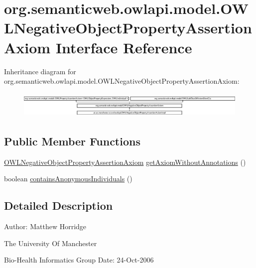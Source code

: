 \hypertarget{interfaceorg_1_1semanticweb_1_1owlapi_1_1model_1_1_o_w_l_negative_object_property_assertion_axiom}{\section{org.\-semanticweb.\-owlapi.\-model.\-O\-W\-L\-Negative\-Object\-Property\-Assertion\-Axiom Interface Reference}
\label{interfaceorg_1_1semanticweb_1_1owlapi_1_1model_1_1_o_w_l_negative_object_property_assertion_axiom}
}
Inheritance diagram for org.\-semanticweb.\-owlapi.\-model.\-O\-W\-L\-Negative\-Object\-Property\-Assertion\-Axiom\-:\begin{figure}[H]
\begin{center}
\leavevmode
\includegraphics[height=1.274658cm]{interfaceorg_1_1semanticweb_1_1owlapi_1_1model_1_1_o_w_l_negative_object_property_assertion_axiom}
\end{center}
\end{figure}
\subsection*{Public Member Functions}
\begin{DoxyCompactItemize}
\item 
\hyperlink{interfaceorg_1_1semanticweb_1_1owlapi_1_1model_1_1_o_w_l_negative_object_property_assertion_axiom}{O\-W\-L\-Negative\-Object\-Property\-Assertion\-Axiom} \hyperlink{interfaceorg_1_1semanticweb_1_1owlapi_1_1model_1_1_o_w_l_negative_object_property_assertion_axiom_adffa4f80e950459c4927e019cb190ed9}{get\-Axiom\-Without\-Annotations} ()
\item 
boolean \hyperlink{interfaceorg_1_1semanticweb_1_1owlapi_1_1model_1_1_o_w_l_negative_object_property_assertion_axiom_a514ff5c4628da0e045f29c4cee511fdf}{contains\-Anonymous\-Individuals} ()
\end{DoxyCompactItemize}


\subsection{Detailed Description}
Author\-: Matthew Horridge\par
 The University Of Manchester\par
 Bio-\/\-Health Informatics Group Date\-: 24-\/\-Oct-\/2006 

